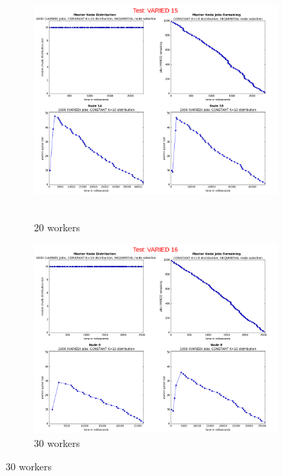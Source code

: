 \documentclass{article}
\begin{document}
\begin{figure}[p]
  
  \begin{subfigure}[b]{0.5\linewidth}
    \centering
    \hbox{\hspace{-5.0em} \includegraphics[width=1.2\linewidth]{combined_varied_growing_workers_constant/case_varied_15} }
    \caption{20 workers} 
    \label{testConstantVaried20} 
    \vspace{4ex}
  \end{subfigure}%
  \begin{subfigure}[b]{0.5\linewidth}
    \centering
    \includegraphics[width=1.2\linewidth]{combined_varied_growing_workers_constant/case_varied_16} 
    \caption{30 workers} 
    \label{testConstantVaried30} 
    \vspace{4ex}
  \end{subfigure} 
  

\end{figure}
\end{document}
